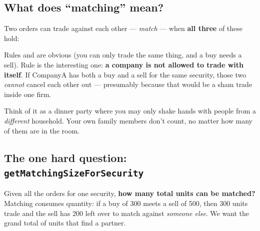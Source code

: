 \subsection{What does ``matching'' mean?}

Two orders can trade against each other --- \emph{match} --- when \textbf{all
three} of these hold:

\begin{center}
\end{center}

Rules  and  are obvious (you can only trade the same thing, and
a buy needs a sell). Rule  is the interesting one: \textbf{a company is
not allowed to trade with itself}. If CompanyA has both a buy and a sell for the
same security, those two \emph{cannot} cancel each other out --- presumably
because that would be a sham trade inside one firm.

\begin{intu}
Think of it as a dinner party where you may only shake hands with people from a
\emph{different} household. Your own family members don't count, no matter how
many of them are in the room.
\end{intu}

\subsection{The one hard question: \texttt{getMatchingSizeForSecurity}}

Given all the orders for one security, \textbf{how many total units can be
matched?} Matching consumes quantity: if a buy of 300 meets a sell of 500, then
300 units trade and the sell has 200 left over to match against \emph{someone
else}. We want the grand total of units that find a partner.

